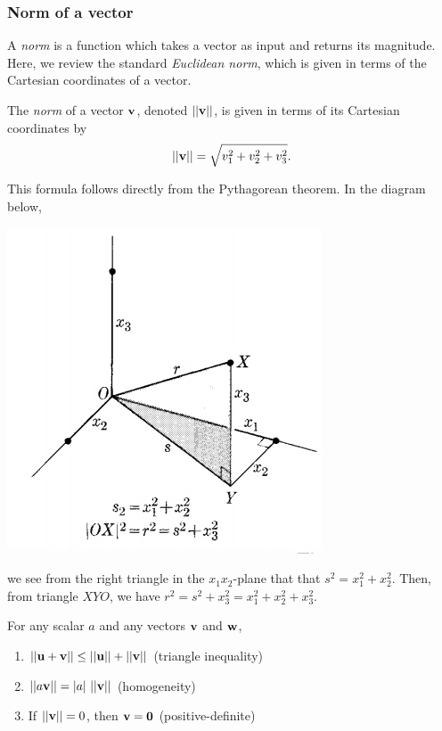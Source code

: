 \documentclass[12pt,letterpaper,reqno]{article}
\numberwithin{equation}{section}
\newcommand{\ti}[1]{\textit{#1}}
\newcommand{\fixme}[1]{{\color{orange}{[#1]}}}
\begin{document}
\begin{pf}
	\fixme{Add proof. Does 1 depend on the triangle inequality?}
\end{pf}


\subsubsection{Norm of a vector}
A \ti{norm} is a function which takes a vector as input and returns its magnitude. Here, we review the standard \ti{Euclidean norm}, which is given in terms of the Cartesian coordinates of a vector. 
\begin{defn}\label{def:length_of_a_vector}
	The \ti{norm} of a vector ${\bf v}$, denoted $||{\bf v}||$, is given in terms of its Cartesian coordinates by
	\begin{align*}
		||{\bf v}||=\sqrt{v_1^2+v_2^2+v_3^2}.
	\end{align*}
\end{defn}

\begin{pf}
This formula follows directly from the Pythagorean theorem. In the diagram below,
\begin{center}
	\includegraphics[scale=0.5]{figures_mvc/euclidean_norm}
\end{center}	
we see from the right triangle in the $x_1x_2$-plane that that $s^2=x_1^2+x_2^2$. Then, from triangle $XYO$, we have $r^2=s^2+x_3^2=x_1^2+x_2^2+x_3^2$.
\end{pf}

\begin{prop}
	For any scalar $a$ and any vectors ${\bf v}$ and ${\bf w}$,
	\begin{enumerate}[(1)]
		\item $||{\bf u}+{\bf v}||\leq ||{\bf u}|| + ||{\bf v}||$ (triangle inequality)
		\item $||a{\bf v}||=|a| \ ||{\bf v}||$ (homogeneity)
		\item If $||{\bf v}||=0$, then ${\bf v}={\bf 0}$ (positive-definite)
	\end{enumerate}
\end{prop}
\end{document}

